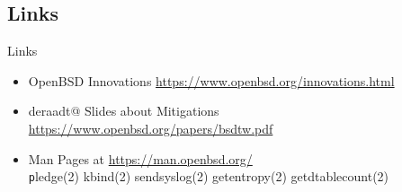 \documentclass[14pt]{beamer}
\begin{document}
\subsection{Links}
\begin{frame}{Links}
\begin{itemize}
    \item OpenBSD Innovations
	{\small \url{https://www.openbsd.org/innovations.html}}
    \item deraadt@ Slides about Mitigations
	{\small \url{https://www.openbsd.org/papers/bsdtw.pdf}}
    \item Man Pages at {\small \url{https://man.openbsd.org/}}\\
	\texttt
	pledge(2)
	kbind(2) 
	sendsyslog(2)
	getentropy(2)
	getdtablecount(2)
	
\end{itemize}
\end{frame}
\end{document}
